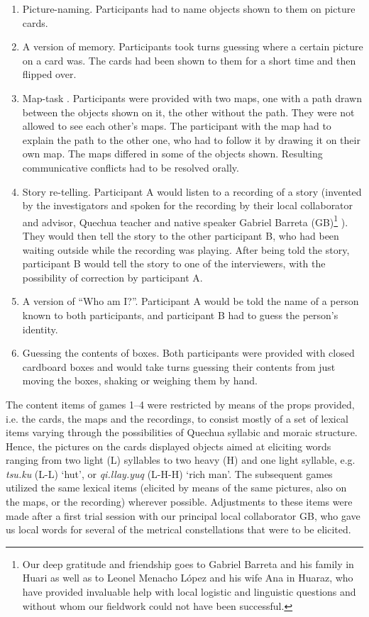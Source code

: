 \documentclass[output=paper]{LSP/langsci}
\begin{document}
\begin{enumerate}
\item {Picture-naming}. Participants had to name objects shown to them on picture cards.

\item {A version of memory}. Participants took turns guessing where a certain picture on a card was. The cards had been shown to them for a short time and then flipped over. 

\item {Map-task} \citep{Anderson1991}. Participants were provided with two maps, one with a path drawn between the objects shown on it, the other without the path. They were not allowed to see each other’s maps. The participant with the map had to explain the path to the other one, who had to follow it by drawing it on their own map. The maps differed in some of the objects shown. Resulting communicative conflicts had to be resolved orally.  

\item {Story re-telling}. Participant A would listen to a recording of a story (invented by the investigators and spoken for the recording by their local collaborator and advisor, Quechua teacher and native speaker Gabriel Barreta (GB)\footnote{Our deep gratitude and friendship goes to Gabriel Barreta and his family in Huari as well as to Leonel Menacho López and his wife Ana in Huaraz, who have provided invaluable help with local logistic and linguistic questions and without whom our fieldwork could not have been successful.} ). They would then tell the story to the other participant B, who had been waiting outside while the recording was playing. After being told the story, participant B would tell the story to one of the interviewers, with the possibility of correction by participant A. 

\item {A version of “Who am I?”}. Participant A would be told the name of a person known to both participants, and participant B had to guess the person’s identity.

\item {Guessing the contents of boxes}. Both participants were provided with closed cardboard boxes and would take turns guessing their contents from just moving the boxes, shaking or weighing them by hand. 
\end{enumerate}


The content items of games 1--4 were restricted by means of the props provided, i.e. the cards, the maps and the recordings, to consist mostly of a set of lexical items varying through the possibilities of Quechua syllabic and moraic structure. Hence, the pictures on the cards displayed objects aimed at eliciting words ranging from two light (L) syllables to two heavy (H) and one light syllable, e.g. \textit{tsu.ku} (L-L) `hut', or \textit{qi.llay.yuq} (L-H-H) `rich man'. The subsequent games utilized the same lexical items (elicited by means of the same pictures, also on the maps, or the recording) wherever possible. Adjustments to these items were made after a first trial session with our principal local collaborator GB, who gave us local words for several of the metrical constellations that were to be elicited. 
\end{document}

